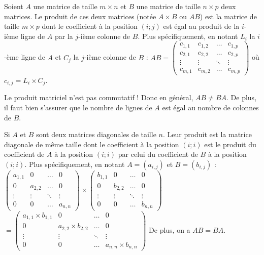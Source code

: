 	\begin{formula}
		Soient $A$ une matrice de taille $m \times n$ et $B$ une matrice de taille $n \times p$ deux matrices. Le produit de ces deux matrices (notée $A \times B$ ou $AB$) est la matrice de taille $m \times p$ dont le coefficient à la position $(i; j)$ est égal au produit de la $i$-ième ligne de $A$ par la $j$-ième colonne de $B$. Plus spécifiquement, en notant $L_i$ la $i$-ème ligne de $A$ et $C_j$ la $j$-ième colonne de $B$ :
		\newpar
		$\displaystyle{AB = \begin{pmatrix}c_{1,1} & c_{1,2} & \dots & c_{1,p} \\ c_{2,1} & c_{2,2} & \dots & c_{2,p} \\ \vdots & \vdots & \ddots & \vdots \\ c_{m,1} & c_{m,2} & \dots & c_{m,p}\end{pmatrix}}$ où $c_{i,j} = L_i \times C_j$.
	\end{formula}

	\begin{tip}[Attention !]
		Le produit matriciel n'est pas commutatif ! Donc en général, $AB \neq BA$.
		\newpar
		De plus, il faut bien s'assurer que le nombre de lignes de $A$ est égal au nombre de colonnes de $B$.
	\end{tip}

	\begin{tip}
		Si $A$ et $B$ sont deux matrices diagonales de taille $n$. Leur produit est la matrice diagonale de même taille dont le coefficient à la position $(i; i)$ est le produit du coefficient de $A$ à la position $(i;i)$ par celui du coefficient de $B$ à la position $(i;i)$. Plus spécifiquement, en notant $A = (a_{i,j})$ et $B = (b_{i,j})$ :
		\newpar
		$\displaystyle{\begin{pmatrix}a_{1,1} & 0 & \dots & 0 \\ 0 & a_{2,2} & \dots & 0 \\ \vdots & \vdots & \ddots & \vdots \\ 0 & 0 & \dots & a_{n,n}\end{pmatrix} \times \begin{pmatrix}b_{1,1} & 0 & \dots & 0 \\ 0 & b_{2,2} & \dots & 0 \\ \vdots & \vdots & \ddots & \vdots \\ 0 & 0 & \dots & b_{n,n}\end{pmatrix}}$
		\newpar
		$\displaystyle{= \begin{pmatrix}a_{1,1} \times b_{1,1} & 0 & \dots & 0 \\ 0 & a_{2,2} \times b_{2,2} & \dots & 0 \\ \vdots & \vdots & \ddots & \vdots \\ 0 & 0 & \dots & a_{n,n} \times b_{n,n}\end{pmatrix}}$
		\newpar
		De plus, on a $AB = BA$.
	\end{tip}

